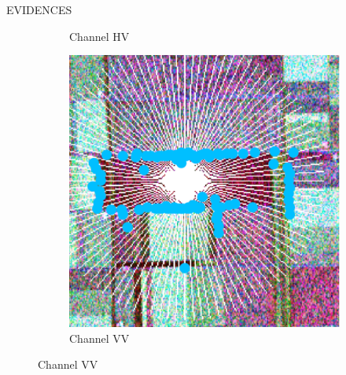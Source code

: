 \documentclass[final]{beamer}
\newlength{\onecolwid}
\newlength{\threecolwid}
\begin{document}
\begin{frame}[t]
\begin{columns}[t,totalwidth=\threecolwid]
\begin{column}{\onecolwid}
\begin{block}{\LARGE{EVIDENCES}}
\begin{figure}[hbt]
\begin{subfigure}{0.32\linewidth}
    \caption{\large{Channel HV}}
  \end{subfigure}
  \begin{subfigure}{0.32\linewidth}
    \centering
    \includegraphics[width=\linewidth]{figures/vv_c.pdf}
    \caption{\large{Channel VV}}
  \end{subfigure}

\end{figure}
\vspace{-1.2cm}


\end{block}
\end{column}
\end{columns}
\end{frame}
\end{document}

